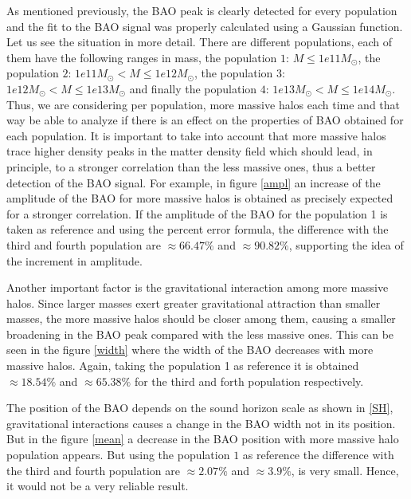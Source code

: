 As mentioned previously, the BAO peak is clearly detected for every population 
and the fit to the BAO signal was properly calculated using a Gaussian function. 
Let us see the situation in more detail. There are different populations, each of 
them have the following ranges in mass, the population $1$: $M \leq 1e11 M_{\odot}$, 
the population $2$: $ 1e11 M_{\odot} <M \leq 1e12 M_{\odot}$, the population $3$: $ 1e12 M_{\odot} <M \leq 1e13 M_{\odot}$ 
and finally the population $4$: $ 1e13 M_{\odot} <M \leq 1e14 M_{\odot}$. 
Thus, we are considering per population, more massive halos each time and that
way be able to analyze if there is an effect on the properties of BAO obtained
for each population. It is important to take into account that more massive halos 
trace higher density peaks in the matter density field which should lead, in principle, 
to a stronger correlation than the less massive ones, thus a better detection of 
the BAO signal. For example, in figure \ref{ampl} an increase of the amplitude 
of the BAO for more massive halos is obtained as precisely expected for a stronger
correlation. If the amplitude of the BAO for the population 1 is taken as reference
and using the percent error formula, the difference with the third and fourth 
population are $\approx 66.47\%$ and $\approx 90.82\%$, supporting the idea of the
increment in amplitude. 

Another important factor is the gravitational interaction among more massive halos.
Since larger masses exert greater gravitational attraction than smaller masses, 
the more massive halos should be closer among them, causing a smaller broadening
in the BAO peak compared with the less massive ones. This can be seen in the
figure \ref{width} where the width of the BAO decreases with more massive halos.
Again, taking the population 1 as reference it is obtained $\approx 18.54\%$ and
$\approx 65.38\%$ for the third and forth population respectively.

The position of the BAO depends on the sound horizon scale as shown in \ref{SH},
gravitational interactions causes a change in the BAO width \cite{Pilar} not in 
its position. But in the figure \ref{mean} a decrease in the BAO position with 
more massive halo population appears. But using the population $1$ as reference
the difference with the third and fourth population are $\approx 2.07\%$ and $\approx 3.9\%$,
is very small. Hence, it would not be a very reliable result. 
	

